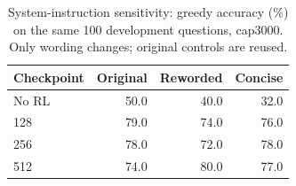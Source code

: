 \begin{table}[t]
\centering
\caption{System-instruction sensitivity: greedy accuracy (\%) on the same 100 development questions, cap3000. Only wording changes; original controls are reused.}
\label{tab:prompt_sensitivity}
\footnotesize
\setlength{\tabcolsep}{4pt}
\begin{tabular}{lrrr}
\toprule
Checkpoint & Original & Reworded & Concise\\
\midrule
No RL & 50.0 & 40.0 & 32.0\\
128 & 79.0 & 74.0 & 76.0\\
256 & 78.0 & 72.0 & 78.0\\
512 & 74.0 & 80.0 & 77.0\\
\bottomrule
\end{tabular}
\end{table}
